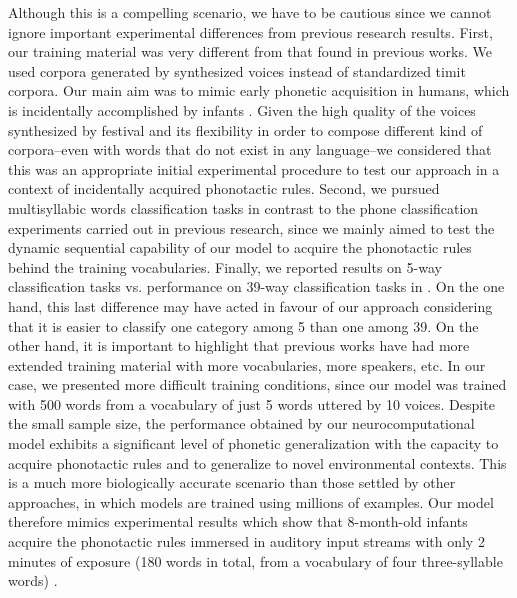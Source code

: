 {Although this is a compelling scenario, we have to be cautious since we cannot ignore important experimental differences from previous research results. First, our training material was very different from that found in previous works. We used corpora generated by synthesized voices instead of standardized \gls{timit} corpora.
Our main aim was to mimic early phonetic acquisition in humans, which is incidentally accomplished by infants \cite{Saffran1996StatisticalLB}.
Given the high quality of the voices synthesized by \gls{festival} \cite{festival2014} and its flexibility in order to compose different kind of corpora--even with words that do not exist in any language--we considered that this was an appropriate initial experimental procedure to test our approach in a context of incidentally acquired phonotactic rules. 
Second, we pursued multisyllabic words classification tasks in contrast to the phone classification experiments carried out in previous research,
since we mainly aimed to test the dynamic sequential capability of our model to acquire the phonotactic rules behind the training vocabularies. 
Finally, we reported results on 5-way classification tasks vs. performance on 39-way classification tasks in \cite{Lee:2009:UFL:2984093.2984217}. 
On the one hand, this last difference may have acted in favour of our approach considering that it is easier to classify one category among 5 than one among 39.
On the other hand, it is important to highlight that previous works have had more extended training material with more vocabularies, more speakers, etc.
In our case, we presented more difficult training conditions, since our model was trained with 500 words from a vocabulary of just 5 words uttered by 10 voices.
Despite the small sample size, the performance obtained by our neurocomputational model exhibits a significant level of phonetic generalization with the capacity to acquire phonotactic rules and to generalize to novel environmental contexts. This is a much more biologically accurate scenario than those settled by other approaches, in which models are trained using millions of examples. Our model therefore mimics experimental results which show that 8-month-old infants  acquire the phonotactic rules immersed in auditory input streams with only 2 minutes of exposure (180 words in total, from a vocabulary of four three-syllable words) \cite{Saffran1996StatisticalLB}.

}
